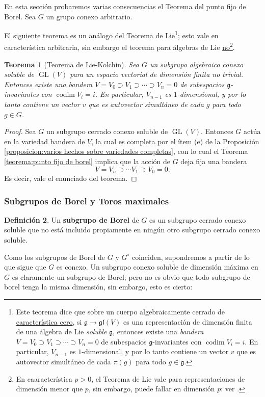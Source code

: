 \documentclass[spanish,10pt]{amsart}
\newtheorem{theorem}{Teorema}[section]
\theoremstyle{definition}
\newtheorem{definition}[theorem]{Definición}
\theoremstyle{remark}
\numberwithin{equation}{section}
\begin{document}
En esta sección probaremos varias consecuencias el Teorema del punto fijo de Borel. Sea $G$ un grupo conexo arbitrario.

El siguiente teorema es un análogo del Teorema de Lie\footnote{Este teorema dice que sobre un cuerpo algebraicamente cerrado de \underline{característica cero}, si $\mathfrak g \to \mathfrak {gl} (V)$ es una representación de dimensión finita de una álgebra de Lie \textit{soluble} $\mathfrak g$, entonces existe una \textit{bandera} $V = V_0 \supset V_1 \supset \cdots \supset V_n = 0$ de subespacios $\mathfrak g$-invariantes con $\operatorname{codim} V_i = i$. En particular, $V_{n-1}$ es $1$-dimensional, y por lo tanto contiene un vector $v$ que es autovector simultáneo de cada $\pi (g)$ para todo $g \in \mathfrak g$.}; esto vale en característica arbitraria, sin embargo el teorema para álgebras de Lie \underline{no}\footnote{En caaracterística $p > 0$, el Teorema de Lie vale para representaciones de dimensión menor que $p$, sin embargo, puede fallar en dimensión $p$: ver \cite{wikipedia-lie-theorem}.}.
\begin{theorem}[Teorema de Lie-Kolchin]\label{teorema:Lie-Kolchin}
Sea $G$ un subgrupo algebraico conexo soluble de $\operatorname{GL} (V)$ para un espacio vectorial de dimensión finita no trivial. Entonces existe una bandera $V = V_0 \supset V_1 \supset \cdots \supset V_n = 0$ de subespacios $\mathfrak g$-invariantes con $\operatorname{codim} V_i = i$. En particular, $V_{n-1}$ es $1$-dimensional, y por lo tanto contiene un vector $v$ que es autovector simultáneo de cada $g$ para todo $g \in G$.
\end{theorem}
\begin{proof}
Sea $G$ un subgrupo cerrado conexo soluble de $\operatorname{GL} (V)$. Entonces $G$ actúa en la variedad bandera de $V$, la cual es completa por el ítem (e) de la Proposición \ref{proposicion:varios hechos sobre variedades completas}, con lo cual el Teorema \ref{teorema:punto fijo de borel} implica que la acción de $G$ deja fija una bandera
\[
    V = V_n \supset \cdots V_1 \supset V_0 = 0.
\]
Es decir, vale el enunciado del teorema.
\end{proof}

\subsubsection{Subgrupos de Borel y Toros maximales}

\begin{definition}
Un \textbf{subgrupo de Borel} de $G$ es un subgrupo cerrado conexo soluble que no está incluido propiamente en ningún otro subgrupo cerrado conexo soluble.
\end{definition}
Como los subgrupos de Borel de $G$ y $G^{\circ}$ coinciden, supondremos a partir de lo que sigue que $G$ es conexo. Un subgrupo conexo soluble de dimensión máxima en $G$ es claramente un subgrupo de Borel; pero no es obvio que todo subgrupo de borel tenga la misma dimensión, sin embargo, esto es cierto:
\end{document}
